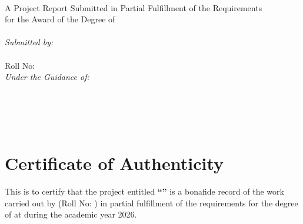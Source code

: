 \begin{titlepage}
\begin{center}
    \vspace*{0.5cm}
    
    {\Huge \textbf{\projectTitle}}\\[1.5cm]
    
    {\large A Project Report Submitted in Partial Fulfillment of the Requirements\\
    for the Award of the Degree of}\\[0.5cm]
    
    {\Large \textbf{\degreeName}}\\[1.5cm]
    
    \textit{Submitted by:}\\[0.3cm]
    {\Large \textbf{\studentName}}\\
    {\large Roll No: \textbf{\studentRoll}}\\[2cm]
    
    \textit{Under the Guidance of:}\\[0.3cm]
    {\Large \textbf{\supervisorName}}\\
    {\large \supervisorDesignation}\\[2.5cm]
    
    {\large \textbf{\departmentName}}\\[0.2cm]
    {\large \textbf{\institutionName}}\\[0.2cm]
    {\large \textbf{\submissionDate}}
    
\end{center}
\end{titlepage}

\newpage
\chapter*{Certificate of Authenticity}
\thispagestyle{plain}

This is to certify that the project entitled \textbf{``\projectTitle''} is a bonafide record of the work carried out by \textbf{\studentName} (Roll No: \textbf{\studentRoll}) in partial fulfillment of the requirements for the degree of \textbf{\degreeName} at \textbf{\institutionName} during the academic year 2026.

